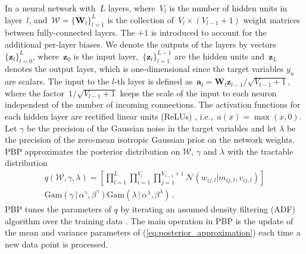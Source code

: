 In a neural network with~$L$ layers, where~$V_l$ is the number of hidden units in layer~$l$, and~${\mathcal{W} = \{ \mathbf{W}_l \}_{l=1}^L}$ is the collection of~${V_l\times (V_{l-1}+1)}$ weight matrices between fully-connected layers. The $+1$ is introduced to account for the additional per-layer biases. We denote the outputs of the layers by vectors~$\{ \mathbf{z}_l \}_{l=0}^{L}$, where~$\mathbf{z}_0$ is the input layer,~${\{\mathbf{z}_l\}_{l=1}^{L-1}}$ are the hidden units and~$\mathbf{z}_L$ denotes the output layer, which is one-dimensional since the target variables $y_n$ are scalars.  
The input to the $l$-th layer is defined as~${\mathbf{a}_l = \mathbf{W}_l \mathbf{z}_{l-1} / \sqrt{V_{l-1}+1} }$,
where the factor~${1/\sqrt{V_{l-1} + 1}}$ keeps the scale of the input to each neuron independent
of the number of incoming connections.
The activation functions for each hidden layer are rectified linear units (ReLUs)
\cite{nair2010rectified}, i.e.,~${a(x) = \max(x,0)}$.
Let $\gamma$ be the precision of the Gaussian noise in the target variables and let $\lambda$
be the precision of the zero-mean isotropic Gaussian prior on the network weights.
PBP approximates the posterior distribution on $\mathcal{W}$, $\gamma$ and $\lambda$ with
the tractable distribution
\begin{multline}
q(\mathcal{W},\gamma, \lambda) = \textstyle \left[ \prod_{l=1}^L\! \prod_{i=1}^{V_l}\! 
\prod_{j=1}^{V_{l\!-\!1}\!+\!1} \mathcal{N}(w_{ij,l}| m_{ij,l},v_{ij,l})\right ]
\\ \text{Gam}(\gamma \,|\, \alpha^\gamma, \beta^\gamma)
\text{Gam}(\lambda \,|\, \alpha^\lambda, \beta^\lambda)\,.\label{eq:posterior_approximation}
\end{multline}
PBP tunes the parameters of $q$ by iterating an assumed
density filtering (ADF) algorithm over the training data \cite{opper1998bayesian}. The main operation in PBP
is the update of the mean and variance parameters of (\ref{eq:posterior_approximation})
each time a new data point is processed. 

